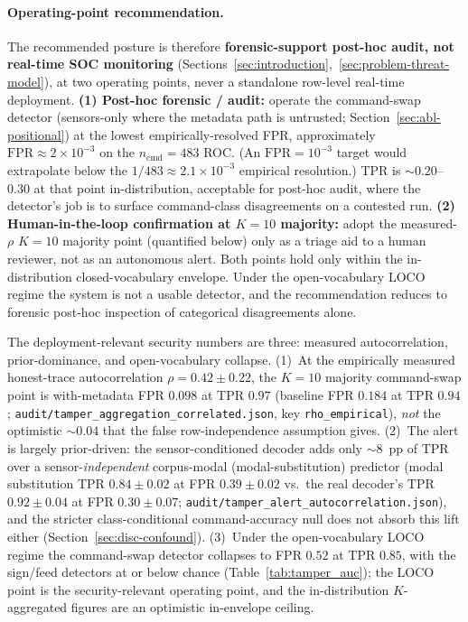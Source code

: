 \documentclass[sensors,article,submit,moreauthors,pdftex]{Definitions/mdpi}
\begin{document}
\paragraph{Operating-point recommendation.} The recommended posture is therefore \textbf{forensic-support post-hoc audit, not real-time SOC monitoring} (Sections~\ref{sec:introduction},~\ref{sec:problem-threat-model}), at two operating points, never a standalone row-level real-time deployment. \textbf{(1) Post-hoc forensic / audit:} operate the command-swap detector (sensors-only where the metadata path is untrusted; Section~\ref{sec:abl-positional}) at the lowest empirically-resolved FPR, approximately $\mathrm{FPR}\!\approx\!2\!\times\!10^{-3}$ on the $n_{\text{cmd}}\!=\!483$ ROC. (An $\mathrm{FPR}\!=\!10^{-3}$ target would extrapolate below the $1/483 \approx 2.1\times 10^{-3}$ empirical resolution.) TPR is $\sim 0.20$--$0.30$ at that point in-distribution, acceptable for post-hoc audit, where the detector's job is to surface command-class disagreements on a contested run. \textbf{(2) Human-in-the-loop confirmation at $K\!=\!10$ majority:} adopt the measured-$\rho$ $K\!=\!10$ majority point (quantified below) only as a triage aid to a human reviewer, not as an autonomous alert. Both points hold only within the in-distribution closed-vocabulary envelope. Under the open-vocabulary LOCO regime the system is not a usable detector, and the recommendation reduces to forensic post-hoc inspection of categorical disagreements alone.

The deployment-relevant security numbers are three: measured autocorrelation, prior-dominance, and open-vocabulary collapse. (1)~At the empirically measured honest-trace autocorrelation $\rho\!=\!0.42 \pm 0.22$, the $K\!=\!10$ majority command-swap point is with-metadata FPR $0.098$ at TPR $0.97$ (baseline FPR $0.184$ at TPR $0.94$; \texttt{audit/tamper\_aggregation\_correlated.json}, key \texttt{rho\_empirical}), \emph{not} the optimistic $\sim\!0.04$ that the false row-independence assumption gives. (2)~The alert is largely prior-driven: the sensor-conditioned decoder adds only $\sim\!8$~pp of TPR over a sensor-\emph{independent} corpus-modal (modal-substitution) predictor (modal substitution TPR $0.84 \pm 0.02$ at FPR $0.39 \pm 0.02$ vs.\ the real decoder's TPR $0.92 \pm 0.04$ at FPR $0.30 \pm 0.07$; \texttt{audit/tamper\_alert\_autocorrelation.json}), and the stricter class-conditional command-accuracy null does not absorb this lift either (Section~\ref{sec:disc-confound}). (3)~Under the open-vocabulary LOCO regime the command-swap detector collapses to FPR $0.52$ at TPR $0.85$, with the sign/feed detectors at or below chance (Table~\ref{tab:tamper_auc}); the LOCO point is the security-relevant operating point, and the in-distribution $K$-aggregated figures are an optimistic in-envelope ceiling.
\end{document}
